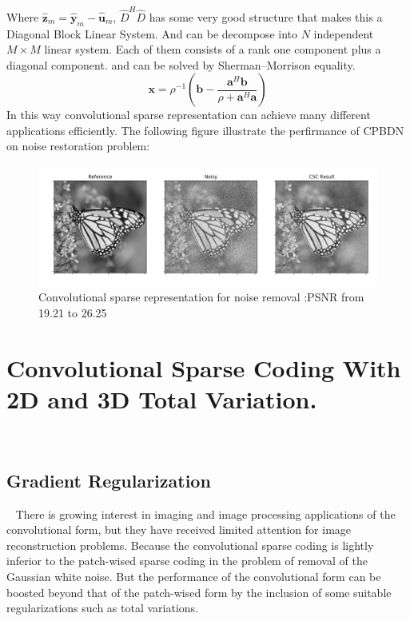 \documentclass[a4paper,11pt]{article}
\begin{document}
 Where $\hat{\mathbf{z}}_m =  \hat{\mathbf{y}}_m - \hat{\mathbf{u}}_m$, $\hat{D}^H\hat{D}$ has some very good structure that makes this a Diagonal Block Linear System. And can be decompose into $N$ independent $M\times M$ linear system. Each of them consists of a rank one component plus a diagonal component. and can be solved by Sherman–Morrison equality.\cite{EGIDI2006703}
 $$ \mathbf{x} = \rho^{-1}\left(\mathbf{b}-\frac{ \mathbf{a}^H \mathbf{b}}{\rho+ \mathbf{a}^H \mathbf{a}} \right)$$
In this way convolutional sparse representation can achieve many different applications efficiently. The following figure illustrate the perfirmance of CPBDN on noise restoration problem:
\begin{figure}[H]
	\centering
	\includegraphics[width=\linewidth]{csc_recover.png}
	\caption{Convolutional sparse representation for noise removal :PSNR from 19.21 to 26.25}
\end{figure}

\section{Convolutional Sparse Coding With 2D and 3D Total Variation.}~
\subsection{Gradient Regularization}~
There is growing interest in imaging and image processing applications of the convolutional form, but they have received limited attention for image reconstruction problems. Because the convolutional sparse coding is lightly inferior to the patch-wised sparse coding in the problem of removal of the Gaussian white noise. But the performance of the convolutional form can be boosted beyond that of the patch-wised form by the inclusion of some suitable regularizations such as total variations. \\ 
\end{document}
